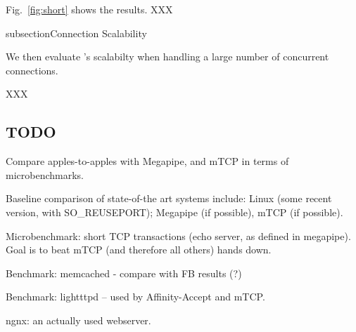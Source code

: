 Fig.~\ref{fig:short} shows the results. XXX


subsection{Connection Scalability}


\label{sec:eval:scale}

We then evaluate \ix's scalabilty when handling a large number of concurrent connections. 

XXX


\subsection{TODO}

\todo Compare apples-to-apples with Megapipe, and mTCP in terms of microbenchmarks.

\todo Baseline comparison of state-of-the art systems include:  Linux (some recent version, with SO\_REUSEPORT); Megapipe (if possible), mTCP (if possible). 

\todo Microbenchmark: short TCP transactions (echo server, as defined in megapipe).   Goal is to beat mTCP (and therefore all others) hands down.

\todo Benchmark: memcached - compare with FB results (?)

\todo Benchmark: lightttpd -- used by Affinity-Accept and mTCP.  

\todo ngnx: an actually used webserver.

